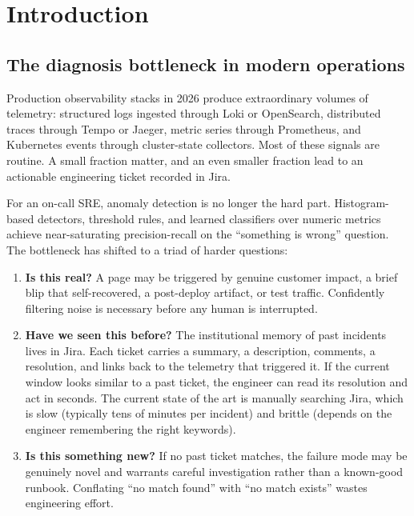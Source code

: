 \section{Introduction}
\label{sec:intro}

\subsection{The diagnosis bottleneck in modern operations}

Production observability stacks in 2026 produce extraordinary volumes of telemetry: structured logs ingested through Loki or OpenSearch, distributed traces through Tempo or Jaeger, metric series through Prometheus, and Kubernetes events through cluster-state collectors. Most of these signals are routine. A small fraction matter, and an even smaller fraction lead to an actionable engineering ticket recorded in Jira.

For an on-call SRE, anomaly detection is no longer the hard part. Histogram-based detectors, threshold rules, and learned classifiers over numeric metrics achieve near-saturating precision-recall on the ``something is wrong'' question. The bottleneck has shifted to a triad of harder questions:

\begin{enumerate}
\item \textbf{Is this real?} A page may be triggered by genuine customer impact, a brief blip that self-recovered, a post-deploy artifact, or test traffic. Confidently filtering noise is necessary before any human is interrupted.

\item \textbf{Have we seen this before?} The institutional memory of past incidents lives in Jira. Each ticket carries a summary, a description, comments, a resolution, and links back to the telemetry that triggered it. If the current window looks similar to a past ticket, the engineer can read its resolution and act in seconds. The current state of the art is manually searching Jira, which is slow (typically tens of minutes per incident) and brittle (depends on the engineer remembering the right keywords).

\item \textbf{Is this something new?} If no past ticket matches, the failure mode may be genuinely novel and warrants careful investigation rather than a known-good runbook. Conflating ``no match found'' with ``no match exists'' wastes engineering effort.
\end{enumerate}

